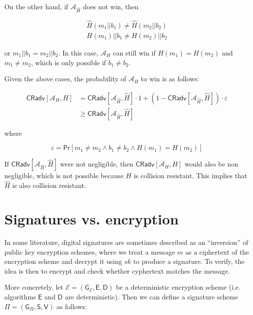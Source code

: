 \documentclass{article}
\begin{document}
On the other hand, if $\mathcal{A}_{\hat{H}}$ does not win, then

\begin{align*}
  \hat{H}(m_1||b_1) \neq \hat{H}(m_2||b_2) \\
  H(m_1)||b_1 \neq H(m_2)||b_2
\end{align*}

or $m_1||b_1 = m_2||b_2$. In this case, $\mathcal{A}_H$ can still
win if $H(m_1) = H(m_2)$ and $m_1 \neq m_2$, which is only possible
if $b_1 \neq b_2$.

Given the above cases, the probability of $\mathcal{A}_H$ to win is as 
follows:

\begin{align*}
\mathsf{CRadv}[\mathcal{A}_H, H] &= 
  \mathsf{CRadv}[\mathcal{A}_{\hat{H}}, \hat{H}] \cdot 1 + 
  (1 - \mathsf{CRadv}[\mathcal{A}_{\hat{H}}, \hat{H}]) \cdot \varepsilon \\
  &\geq \mathsf{CRadv}[\mathcal{A}_{\hat{H}}, \hat{H}]
\end{align*}

where

$$
  \varepsilon = 
    \mathsf{Pr}[m_1 \neq m_2 \land b_1 \neq b_2 \land H(m_1) = H(m_2)]
$$

If $\mathsf{CRadv}[\mathcal{A}_{\hat{H}}, \hat{H}]$ were not negligible,
then $\mathsf{CRadv}[\mathcal{A}_H, H]$ would also be non negligible,
which is not possible because $H$ is collision resistant. This implies
that $\hat{H}$ is also collision resistant.

\section{Signatures vs. encryption}

In some literature, digital signatures are sometimes described as an 
``inversion'' of public key encryption schemes, where we treat a message
$m$ as a ciphertext of the encryption scheme and decrypt it using $sk$
to produce a signature. To verify, the idea is then to encrypt and check 
whether cyphertext matches the message.

More concretely, let 
$\mathcal{E} = (\mathsf{G}_\mathcal{E}, \mathsf{E}, \mathsf{D})$ be a 
deterministic encryption scheme (i.e. algorithms $\mathsf{E}$ and 
$\mathsf{D}$ are deterministic). Then we can define a signature 
scheme $\Pi = (\mathsf{G}_{\Pi}, \mathsf{S}, \mathsf{V})$ as follows:
\end{document}
